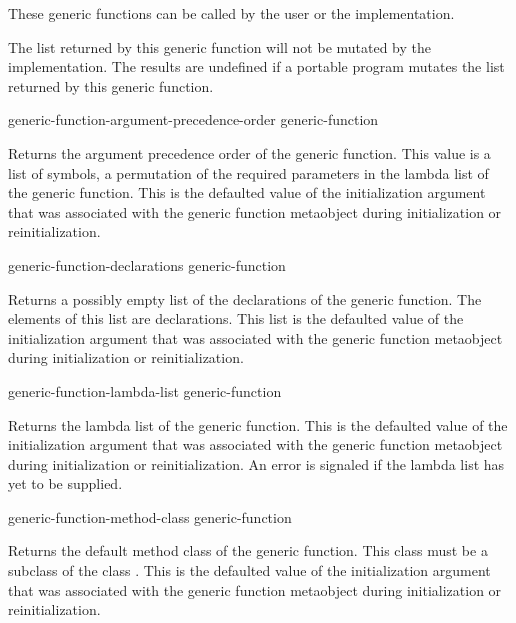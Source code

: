These generic functions can be called by the user or the implementation.

The list returned by this generic function will not be mutated by the
implementation. The results are undefined if a portable program mutates the list
returned by this generic function.

\begin{defun}
generic-function-argument-precedence-order generic-function

Returns the argument precedence order of the generic function. This value is a
list of symbols, a permutation of the required parameters in the lambda list of
the generic function. This is the defaulted value of the
 initialization argument that was associated with the
generic function metaobject during initialization or reinitialization.
\end{defun}

\begin{defun}
generic-function-declarations generic-function

Returns a possibly empty list of the declarations of the generic function. The
elements of this list are declarations. This list is the defaulted value of the
 initialization argument that was associated with the generic
function metaobject during initialization or reinitialization.
\end{defun}

\begin{defun}
generic-function-lambda-list generic-function

Returns the lambda list of the generic function. This is the defaulted value of
the  initialization argument that was associated with the generic
function metaobject during initialization or reinitialization. An error is
signaled if the lambda list has yet to be supplied.
\end{defun}

\begin{defun}
generic-function-method-class generic-function

Returns the default method class of the generic function. This class must be a
subclass of the class . This is the defaulted value of the 
initialization argument that was associated with the generic function metaobject
during initialization or reinitialization.
\end{defun}

